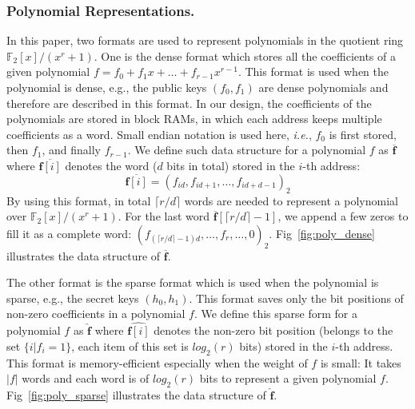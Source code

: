 \documentclass[runningheads]{llncs}
\begin{document}
\subsubsection{Polynomial Representations.}
In this paper, two formats are used to represent polynomials in
the quotient ring $\mathbb{F}_2[x]/(x^r+1)$.
One is the dense format which stores all the coefficients
of a given polynomial $f=f_0+f_1x+\ldots +f_{r-1}x^{r-1}$. %
This format is used when the polynomial is dense, e.g.,
the public keys $(f_0, f_1)$ are dense polynomials
and therefore are described in this format.
In our design, the coefficients of the polynomials are
stored in block RAMs, in which each address keeps multiple coefficients as a word.
Small endian notation is used here, \textit{i.e.}, $f_0$ is first stored, then $f_1$, and finally $f_{r-1}$.
We define such data structure for a polynomial $f$ as $\overline{\mathbf{f}}$
where $\overline{\mathbf{f}[i]}$ denotes the word ($d$ bits in total) stored in the $i$-th address:
\[
\overline{\mathbf{f}[i]} = (f_{id},f_{id+1},\ldots,f_{id+d-1})_2
\]
By using this format, in total $\lceil r/d \rceil$ words
are needed to represent a polynomial over $\mathbb{F}_2[x]/(x^r+1)$.
For the last word  $\mathbf{\overline{f}}[\lceil r/d \rceil-1]$,
we append a few zeros to fill it as a complete word:
$(f_{(\lceil r/d\rceil-1)d},\ldots, f_{r},\ldots,0)_2$.
Fig~\ref{fig:poly_dense} illustrates the data structure of $\overline{\mathbf{f}}$.

The other format is the sparse format which is used
when the polynomial is sparse, e.g.,
the secret keys $(h_0, h_1)$.
This format saves only the bit positions of non-zero coefficients in a polynomial $f$.
We define this sparse form for a polynomial $f$ as $\mathbf{\hat{f}}$ where
$\hat{\mathbf{f}[i]}$ denotes the non-zero bit position (belongs to the set $\{i|f_i=1\}$, each item of this set is $log_2(r)$ bits) stored in the $i$-th address.
This format is memory-efficient especially when
the weight of $f$ is small:
It takes $|f|$ words and each word is of $log_2(r)$ bits to
represent a given polynomial $f$. %
Fig~\ref{fig:poly_sparse} illustrates the data structure of $\mathbf{\hat{f}}$.
\end{document}

